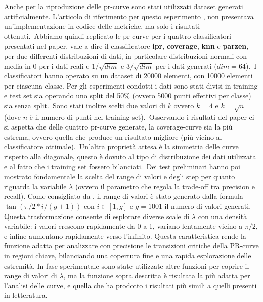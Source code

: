 Anche per la riproduzione delle pr-curve sono stati utilizzati dataset generati artificialmente. L'articolo di riferimento per questo esperimento \cite{pr-curve}, non presentava un'implementazione in codice delle metriche, ma solo i risultati ottenuti.\
Abbiamo quindi replicato le pr-curve per i quattro classificatori presentati nel paper, vale a dire il classificatore \textbf{ipr}, \textbf{coverage}, \textbf{knn} e \textbf{parzen}, per due differenti distribuzioni di dati, in particolare distribuzioni normali con media in \(0\) per i dati reali  e \(1/\sqrt{dim}\) e \(3/\sqrt{dim}\) per i dati generati (\(dim = 64\)).\ 
I classificatori hanno operato su un dataset di 20000 elementi, con 10000 elementi per ciascuna classe. Per gli esperimenti condotti i dati sono stati divisi in training e test set sia operando uno split del 50\% (ovvero 5000 punti effettivi per classe) sia senza split.\
Sono stati inoltre scelti due valori di \( k \) ovvero \(k = 4\) e \(k = \sqrt{n}\) (dove \(n\) è il numero di punti nel training set).\
Osservando i risultati del paper ci si aspetta che delle quattro pr-curve generate, la coverage-curve sia la più estrema, ovvero quella che produce un risultato migliore (più vicino al classificatore ottimale).\
Un'altra proprietà attesa è la simmetria delle curve rispetto alla diagonale, questo è dovuto al tipo di distribuzione dei dati utilizzata e al fatto che i training set fossero bilanciati.\
Dei test preliminari hanno poi mostrato fondamentale la scelta del range di valori e degli step per quanto riguarda la variabile \( \lambda \) (ovvero il parametro che regola la trade-off tra precision e recall). 
Come consigliato da \cite{7AssessingWithPrecisionRecall} , il range di valori è stato generato dalla formula \( \tan(\pi/2 * i/(g+1)) \) con \( i \in [1, g] \) e \( g = 1001\) il numero di valori generati. Questa trasformazione consente di esplorare diverse scale di \(\lambda\) con una densità variabile: i valori crescono rapidamente da 0 a 1, variano lentamente vicino a \(\pi/2\)​, e infine aumentano rapidamente verso l'infinito. Questa caratteristica rende la funzione adatta per analizzare con precisione le transizioni critiche della PR-curve in regioni chiave, bilanciando una copertura fine e una rapida esplorazione delle estremità. 
In fase sperimentale sono state utilizzate altre funzioni per coprire il range di valori di \(\lambda\), ma la funzione sopra descritta è risultata la più adatta per l'analisi delle curve, e quella che ha prodotto i risultati più simili a quelli presenti in letteratura.

